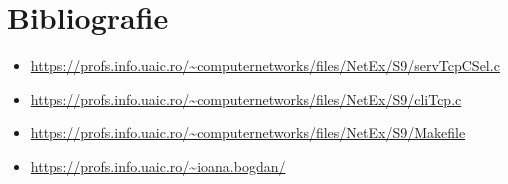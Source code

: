 \documentclass{article}
\begin{document}
\section {Bibliografie}
\begin{thebibliography}{}
\begin{itemize}
\item
\url{https://profs.info.uaic.ro/~computernetworks/files/NetEx/S9/servTcpCSel.c}
\item
\url{https://profs.info.uaic.ro/~computernetworks/files/NetEx/S9/cliTcp.c}
\item
\url{https://profs.info.uaic.ro/~computernetworks/files/NetEx/S9/Makefile}
\item
\url{https://profs.info.uaic.ro/~ioana.bogdan/}
\end{itemize}
\end{thebibliography}
\end{document}

